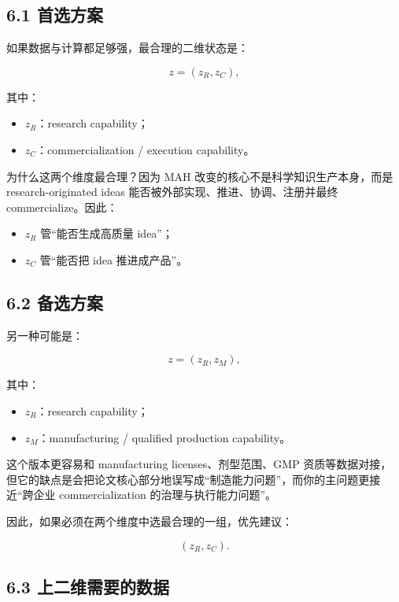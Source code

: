 \documentclass[12pt]{ctexart}
\begin{document}
\subsection{6.1 首选方案}

如果数据与计算都足够强，最合理的二维状态是：

\[
z=(z_R,z_C),
\]

其中：

\begin{itemize}[leftmargin=2em]
    \item \(z_R\)：research capability；
    \item \(z_C\)：commercialization / execution capability。
\end{itemize}

为什么这两个维度最合理？因为 MAH 改变的核心不是科学知识生产本身，而是 research-originated ideas 能否被外部实现、推进、协调、注册并最终 commercialize。因此：

\begin{itemize}[leftmargin=2em]
    \item \(z_R\) 管“能否生成高质量 idea”；
    \item \(z_C\) 管“能否把 idea 推进成产品”。
\end{itemize}

\subsection{6.2 备选方案}

另一种可能是：

\[
z=(z_R,z_M),
\]

其中：

\begin{itemize}[leftmargin=2em]
    \item \(z_R\)：research capability；
    \item \(z_M\)：manufacturing / qualified production capability。
\end{itemize}

这个版本更容易和 manufacturing licenses、剂型范围、GMP 资质等数据对接，
但它的缺点是会把论文核心部分地误写成“制造能力问题”，而你的主问题更接近“跨企业 commercialization 的治理与执行能力问题”。

因此，如果必须在两个维度中选最合理的一组，优先建议：

\[
(z_R,z_C).
\]

\subsection{6.3 上二维需要的数据}
\end{document}

